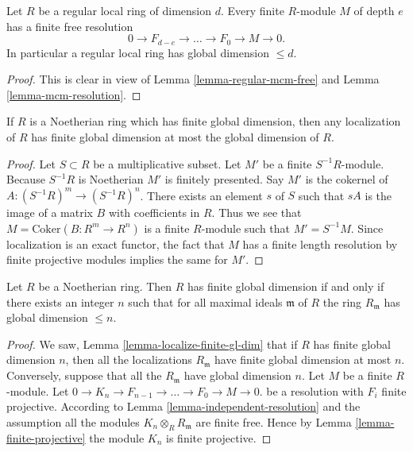 \begin{proposition}
\label{proposition-regular-finite-gl-dim}
Let $R$ be a regular local ring of dimension $d$.
Every finite $R$-module $M$ of depth $e$ has a finite free
resolution
$$
0 \to F_{d-e} \to \ldots \to F_0 \to M \to 0.
$$
In particular a regular local ring has global dimension $\leq d$.
\end{proposition}

\begin{proof}
This is clear in view of Lemma \ref{lemma-regular-mcm-free}
and Lemma \ref{lemma-mcm-resolution}.
\end{proof}

\begin{lemma}
\label{lemma-localize-finite-gl-dim}
If $R$ is a Noetherian ring which has finite global dimension,
then any localization of $R$ has finite global dimension
at most the global dimension of $R$.
\end{lemma}

\begin{proof}
Let $S \subset R$ be a multiplicative subset.
Let $M'$ be a finite $S^{-1}R$-module.
Because $S^{-1}R$ is Noetherian $M'$ is finitely presented.
Say $M'$ is the cokernel of $A : (S^{-1}R)^m
\to (S^{-1}R)^n$. There exists an element $s$ of $S$ such
that $sA$ is the image of a matrix $B$ with coefficients in $R$.
Thus we see that $M = \text{Coker}(B : R^m \to R^n)$
is a finite $R$-module such that $M' = S^{-1}M$.
Since localization is an exact functor, the fact that
$M$ has a finite length resolution by finite projective
modules implies the same for $M'$.
\end{proof}

\begin{lemma}
\label{lemma-finite-gl-dim-primes}
Let $R$ be a Noetherian ring.
Then $R$ has finite global dimension if and
only if there exists an integer $n$ such that
for all maximal ideals $\mathfrak m$ of $R$
the ring $R_{\mathfrak m}$ has global dimension
$\leq n$.
\end{lemma}

\begin{proof}
We saw, Lemma \ref{lemma-localize-finite-gl-dim}
that if $R$ has finite global dimension $n$,
then all the localizations $R_{\mathfrak m}$
have finite global dimension at most $n$.
Conversely, suppose that all the $R_{\mathfrak m}$
have global dimension $n$. Let $M$ be a finite
$R$-module. Let
$0 \to K_n \to F_{n-1} \to \ldots \to F_0 \to M\to 0$.
be a resolution with $F_i$ finite projective.
According to Lemma \ref{lemma-independent-resolution}
and the assumption all the modules $K_n \otimes_R R_{\mathfrak m}$
are finite free. Hence by Lemma \ref{lemma-finite-projective}
the module $K_n$ is finite projective.
\end{proof}

